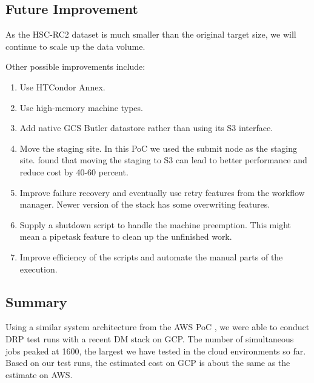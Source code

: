 \subsection{Future Improvement} \label{sec:future}

As the HSC-RC2 dataset is much smaller than the original target size, we will continue to scale up the data volume.

Other possible improvements include:
\begin{enumerate}
\item Use HTCondor Annex.
\item Use high-memory machine types.
\item Add native GCS Butler datastore rather than using its S3 interface.
\item Move the staging site. In this PoC we used the submit node as the staging site. \citet{Bektesevic2020} found that moving the staging to S3 can lead to better performance and reduce cost by 40-60 percent.
\item Improve failure recovery and eventually use retry features from the workflow manager. Newer version of the stack has some overwriting features.
\item Supply a shutdown script to handle the machine preemption. This might mean a pipetask feature to clean up the unfinished work.
\item Improve efficiency of the scripts and automate the manual parts of the execution.



\end{enumerate}

\subsection{Summary}
Using a similar system architecture from the AWS PoC , we were able to conduct DRP test runs with a recent DM stack on GCP.
The number of simultaneous jobs peaked at 1600, the largest we have tested in the cloud environments so far.
Based on our test runs, the estimated cost on GCP is about the same as the estimate on AWS.
